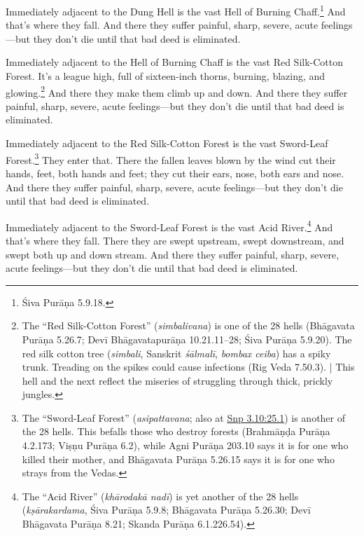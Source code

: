 \documentclass[12pt,openany]{book}%
\begin{document}
Immediately adjacent to the Dung Hell is the vast Hell of Burning Chaff.\footnote{Śiva \textsanskrit{Purāṇa} 5.9.18. } And that’s where they fall. And there they suffer painful, sharp, severe, acute feelings—but they don’t die until that bad deed is eliminated. 

Immediately adjacent to the Hell of Burning Chaff is the vast Red Silk-Cotton Forest. It’s a league high, full of sixteen-inch thorns, burning, blazing, and glowing.\footnote{The “Red Silk-Cotton Forest” (\textit{simbalivana}) is one of the 28 hells (\textsanskrit{Bhāgavata} \textsanskrit{Purāṇa} 5.26.7; \textsanskrit{Devī} \textsanskrit{Bhāgavatapurāṇa} 10.21.11–28; Śiva \textsanskrit{Purāṇa} 5.9.20). The red silk cotton tree (\textit{simbali}, Sanskrit \textit{\textsanskrit{śālmalī}}, \textit{bombax ceiba}) has a spiky trunk. Treading on the spikes could cause infections (Rig Veda 7.50.3). | This hell and the next reflect the miseries of struggling through thick, prickly jungles. } And there they make them climb up and down. And there they suffer painful, sharp, severe, acute feelings—but they don’t die until that bad deed is eliminated. 

Immediately adjacent to the Red Silk-Cotton Forest is the vast Sword-Leaf Forest.\footnote{The “Sword-Leaf Forest” (\textit{asipattavana}; also at \href{https://suttacentral.net/snp3.10/en/sujato\#25.1}{Snp 3.10:25.1}) is another of the 28 hells. This befalls those who destroy forests (\textsanskrit{Brahmāṇḍa} \textsanskrit{Purāṇa} 4.2.173; \textsanskrit{Viṣṇu} \textsanskrit{Purāṇa} 6.2), while Agni \textsanskrit{Purāṇa} 203.10 says it is for one who killed their mother, and \textsanskrit{Bhāgavata} \textsanskrit{Purāṇa} 5.26.15 says it is for one who strays from the Vedas. } They enter that. There the fallen leaves blown by the wind cut their hands, feet, both hands and feet; they cut their ears, nose, both ears and nose. And there they suffer painful, sharp, severe, acute feelings—but they don’t die until that bad deed is eliminated. 

Immediately adjacent to the Sword-Leaf Forest is the vast Acid River.\footnote{The “Acid River” (\textit{\textsanskrit{khārodakā} \textsanskrit{nadī}}) is yet another of the 28 hells (\textit{\textsanskrit{kṣārakardama}}, Śiva \textsanskrit{Purāṇa} 5.9.8; \textsanskrit{Bhāgavata} \textsanskrit{Purāṇa} 5.26.30; \textsanskrit{Devī} \textsanskrit{Bhāgavata} \textsanskrit{Purāṇa} 8.21; Skanda \textsanskrit{Purāṇa} 6.1.226.54). } And that’s where they fall. There they are swept upstream, swept downstream, and swept both up and down stream. And there they suffer painful, sharp, severe, acute feelings—but they don’t die until that bad deed is eliminated. 
\end{document}
